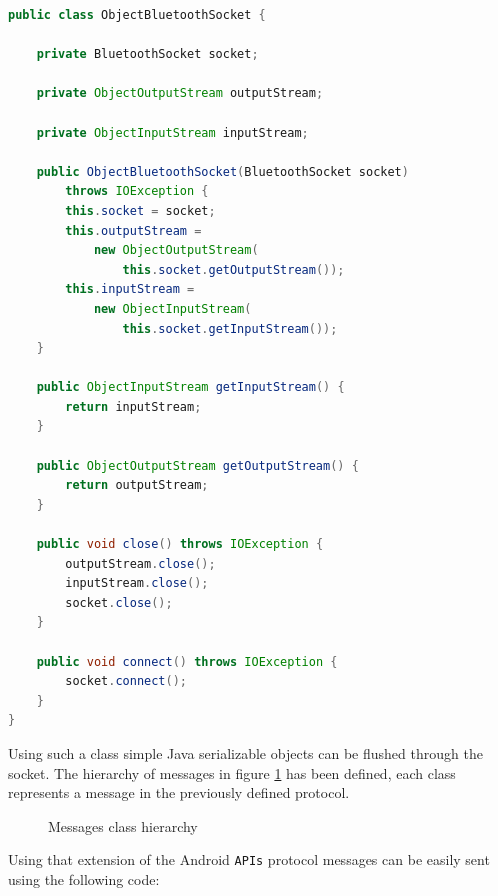 \documentclass[conference, 11pt]{IEEEtran}
\begin{document}
\begin{lstlisting}[language=Java, caption=ObjectBluetoothSocket class]
public class ObjectBluetoothSocket {
	
	private BluetoothSocket socket;
	
	private ObjectOutputStream outputStream;
	
	private ObjectInputStream inputStream;
	
	public ObjectBluetoothSocket(BluetoothSocket socket) 
		throws IOException {
		this.socket = socket;
		this.outputStream = 
			new ObjectOutputStream(
				this.socket.getOutputStream());
		this.inputStream = 
			new ObjectInputStream(
				this.socket.getInputStream());
	}
	
	public ObjectInputStream getInputStream() {
		return inputStream;
	}
	
	public ObjectOutputStream getOutputStream() {
		return outputStream;
	}
	
	public void close() throws IOException {
		outputStream.close();
		inputStream.close();
		socket.close();
	}
	
	public void connect() throws IOException {
		socket.connect();
	}
}
\end{lstlisting}
Using such a class simple Java serializable objects can be flushed through the socket. The hierarchy of messages in figure \ref{img:messages} has been defined, each class represents a message in the previously defined protocol.

\begin{figure}[!ht]
\begin{center}
\caption{Messages class hierarchy}
\label{img:messages}
\end{center}
\end{figure}

Using that extension of the Android \texttt{APIs} protocol messages can be easily sent using the following code:
\end{document}
